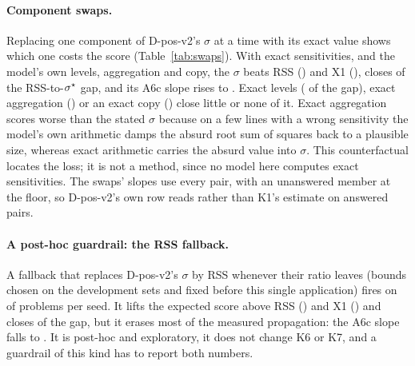 \paragraph{Component swaps.}
Replacing one component of D-pos-v2's $\sigma$ at a time with its exact value shows which one costs the score
(Table~\ref{tab:swaps}).
With exact sensitivities, and the model's own levels, aggregation and copy, the $\sigma$ beats RSS
() and X1 (), closes  of the RSS-to-$\sigma^{\star}$ gap, and its A6c
slope rises to .
Exact levels ( of the gap), exact aggregation () or an exact copy
() close little or none of it.
Exact aggregation scores worse than the stated $\sigma$ because on a few lines with a wrong sensitivity the model's own
arithmetic damps the absurd root sum of squares back to a plausible size, whereas exact arithmetic carries the absurd
value into $\sigma$.
This counterfactual locates the loss; it is not a method, since no model here computes exact sensitivities.
The swaps' slopes use every pair, with an unanswered member at the floor, so D-pos-v2's own row reads
 rather than K1's estimate on answered pairs.

\paragraph{A post-hoc guardrail: the RSS fallback.}
A fallback that replaces D-pos-v2's $\sigma$ by RSS whenever their ratio leaves  (bounds chosen on
the development sets and fixed before this single application) fires on  of problems per seed.
It lifts the expected score above RSS () and X1 () and closes  of the gap,
but it erases most of the measured propagation: the A6c slope falls to .
It is post-hoc and exploratory, it does not change K6 or K7, and a guardrail of this kind has to report both numbers.

